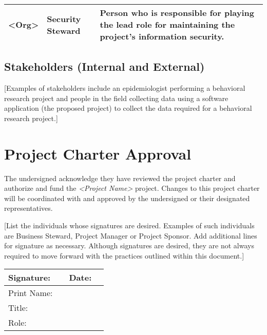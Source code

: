 \documentclass[a4paper, 11pt]{article}
\begin{document}
\begin{longtable}[]{@{}lll@{}}
\begin{minipage}[t]{0.30\columnwidth}
\textless{}Org\textgreater{}\strut
\end{minipage} & \begin{minipage}[t]{0.30\columnwidth}\raggedright
Security Steward\strut
\end{minipage} & \begin{minipage}[t]{0.30\columnwidth}\raggedright
Person who is responsible for playing the lead role for maintaining the
project's information security.\strut
\end{minipage}\tabularnewline
\bottomrule
\end{longtable}

\hypertarget{stakeholders-internal-and-external}{%
\subsection{Stakeholders (Internal and
External)}\label{stakeholders-internal-and-external}}

{[}Examples of stakeholders include an epidemiologist performing a
behavioral research project and people in the field collecting data
using a software application (the proposed project) to collect the data
required for a behavioral research project.{]}

\newpage


\hypertarget{project-charter-approval}{%
\section{Project Charter Approval}\label{project-charter-approval}}

The undersigned acknowledge they have reviewed the project charter and
authorize and fund the \emph{\textless{}Project Name\textgreater{}}
project. Changes to this project charter will be coordinated with and
approved by the undersigned or their designated representatives.

{[}List the individuals whose signatures are desired. Examples of such
individuals are Business Steward, Project Manager or Project Sponsor.
Add additional lines for signature as necessary. Although signatures are
desired, they are not always required to move forward with the practices
outlined within this document.{]}

\begin{longtable}[]{@{}llll@{}}
\toprule
Signature: & & Date: &\tabularnewline
\midrule
\endhead
Print Name: & & &\tabularnewline
Title: & & &\tabularnewline
Role: & & &\tabularnewline
\bottomrule
\end{longtable}
\end{document}
